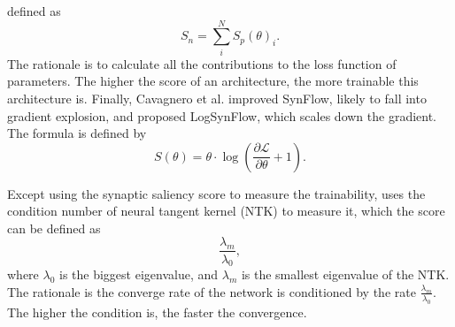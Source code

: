 \documentclass[sigconf]{acmart}
\begin{document}
    defined as 
    \begin{equation}
        \label{equ:zero_cost}
        S_n=\sum^N_i S_p(\theta)_i.
    \end{equation}
    The rationale is to calculate all the contributions to the loss function of parameters. 
    The higher the score of an architecture, the more trainable this architecture is. 
    Finally, Cavagnero et al. \cite{Cavagnero_2023} improved SynFlow, likely to fall into 
    gradient explosion, and proposed LogSynFlow, which scales down the gradient. 
    The formula is defined by 
    \begin{equation}
        \label{equ:logsynflow}
        S(\theta)=\theta\cdot\log(\frac{\partial \mathcal L}{\partial \theta}+1).
    \end{equation}

    Except using the synaptic saliency score to measure the trainability, 
    \cite{https://doi.org/10.48550/arxiv.2102.11535} uses the condition number of neural tangent 
    kernel (NTK) \cite{jacot2020neural} to measure it, which the score can be defined as 
    \begin{equation}
        \label{equ:cn_ntk}
        \frac{\lambda_m}{\lambda_0}, 
    \end{equation}
    where $\lambda_0$ is the biggest eigenvalue, and $\lambda_m$ is the smallest eigenvalue of the 
    NTK. The rationale is the converge rate of the network is conditioned by the rate 
    $\frac{\lambda_m}{\lambda_0}$. The higher the condition is, the faster the convergence. 
\end{document}
